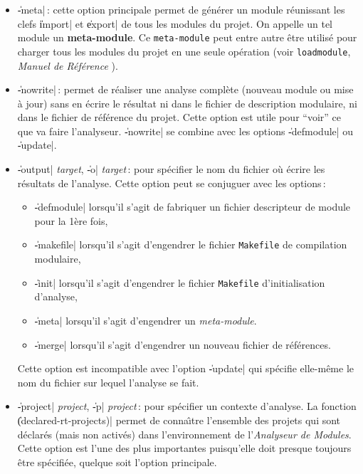 \begin{itemize}
\item {\Large \|-meta|}\,: cette option principale permet 
de g\'{e}n\'{e}rer un module r\'{e}unissant les clefs \|import| et \|export| de
tous les modules du projet. On appelle un tel module un {\bf
meta-module}. Ce {\tt meta-module} peut entre autre \^{e}tre utilis\'{e}
pour charger tous les modules du projet en une seule op\'{e}ration (voir
{\tt loadmodule}, {\em Manuel de R\'{e}f\'{e}rence} \LeLisp).

\item {\Large \|-nowrite|}\,: permet de r\'{e}aliser une analyse compl\`{e}te
(nouveau module ou mise \`{a} jour) sans en \'{e}crire le r\'{e}sultat ni dans
le fichier de description modulaire, ni dans le fichier de r\'{e}f\'{e}rence
du projet. Cette option est utile pour ``voir{''} ce que va faire
l'analyseur. 
\|-nowrite| se combine avec les options \|-defmodule| ou \|-update|.

\item {\Large \|-output| {\em target}, \|-o| {\em target}}\,: pour
sp\'{e}cifier le nom 
du fichier o\`{u} \'{e}crire les r\'{e}sultats de l'analyse. Cette option peut
se conjuguer avec les options\,:
\begin {itemize}
\item \|-defmodule| lorsqu'il s'agit de
fabriquer un fichier descripteur de module pour la 1\`{e}re fois,
\item \|-makefile| lorsqu'il s'agit d'engendrer le fichier {\tt Makefile} de
compilation modulaire,
\item \|-init| lorsqu'il s'agit d'engendrer le fichier {\tt Makefile}
d'initialisation d'analyse,
\item \|-meta| lorsqu'il s'agit d'engendrer un {\em meta-module}.
\item \|-merge| lorsqu'il s'agit d'engendrer un nouveau fichier de
r\'{e}f\'{e}rences. 
\end{itemize}
Cette option est incompatible avec l'option \|-update| qui sp\'{e}cifie
elle-m\^{e}me le nom du fichier sur lequel l'analyse se fait.

\item {\Large \|-project| {\em project}, \|-p| {\em project}}\,: pour sp\'{e}cifier un
contexte d'analyse. La fonction
\|(declared-rt-projects)| permet de conna\^{\i}tre l'ensemble des projets
qui sont d\'{e}clar\'{e}s (mais non activ\'{e}s) dans l'environnement de
l'{\em Analyseur de Modules}. Cette option est l'une des plus importantes
puisqu'elle doit presque toujours \^{e}tre sp\'{e}cifi\'{e}e, quelque soit
l'option principale.


\end{itemize}

